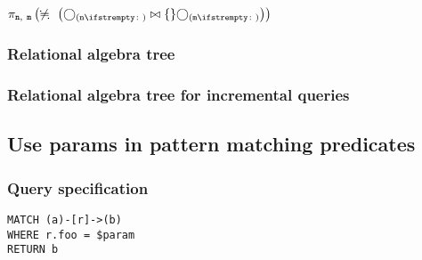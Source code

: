 $\projection{\var{n},~\var{m}} \left(\alldifferent{} \left(\getvertices{n}{} \join \{\} \getvertices{m}{}\right)\right)$

\subsubsection*{Relational algebra tree}


\subsubsection*{Relational algebra tree for incremental queries}


\subsection{Use params in pattern matching predicates}

\subsubsection*{Query specification}

\begin{lstlisting}
MATCH (a)-[r]->(b)
WHERE r.foo = $param
RETURN b
\end{lstlisting}

